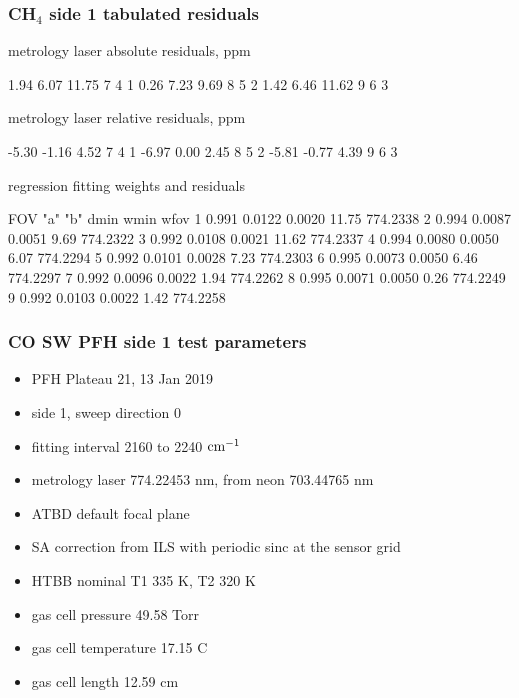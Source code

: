 \documentclass[10pt]{beamer}
\begin{document}
\begin{frame}[fragile]
\frametitle{CH$_4$ side 1 tabulated residuals}

  metrology laser absolute residuals, ppm
\begin{semiverbatim}\scriptsize
      1.94     6.07    11.75         7   4   1
      0.26     7.23     9.69         8   5   2
      1.42     6.46    11.62         9   6   3
\end{semiverbatim}

  metrology laser relative residuals, ppm
\begin{semiverbatim}\scriptsize
     -5.30    -1.16     4.52         7   4   1
     -6.97     0.00     2.45         8   5   2
     -5.81    -0.77     4.39         9   6   3
 \end{semiverbatim}

     regression fitting weights and residuals
\begin{semiverbatim}\scriptsize
 FOV   "a"       "b"     dmin     wmin      wfov
  1   0.991    0.0122   0.0020    11.75   774.2338 
  2   0.994    0.0087   0.0051     9.69   774.2322 
  3   0.992    0.0108   0.0021    11.62   774.2337 
  4   0.994    0.0080   0.0050     6.07   774.2294 
  5   0.992    0.0101   0.0028     7.23   774.2303 
  6   0.995    0.0073   0.0050     6.46   774.2297 
  7   0.992    0.0096   0.0022     1.94   774.2262 
  8   0.995    0.0071   0.0050     0.26   774.2249 
  9   0.992    0.0103   0.0022     1.42   774.2258 
\end{semiverbatim}

\end{frame}
\begin{frame}
\frametitle{CO SW PFH side 1 test parameters}

\begin{itemize}
  \item PFH Plateau 21, 13 Jan 2019
  \item side 1, sweep direction 0
  \item fitting interval 2160 to 2240 $\mbox{cm$^{-1}$}$
  \item metrology laser 774.22453 nm, from neon 703.44765 nm
  \item ATBD default focal plane
  \item SA correction from ILS with periodic sinc at the sensor grid
  \item HTBB nominal T1 335 K, T2 320 K
  \item gas cell pressure 49.58 Torr
  \item gas cell temperature 17.15 C
  \item gas cell length 12.59 cm
\end{itemize}

\end{frame}
\end{document}
